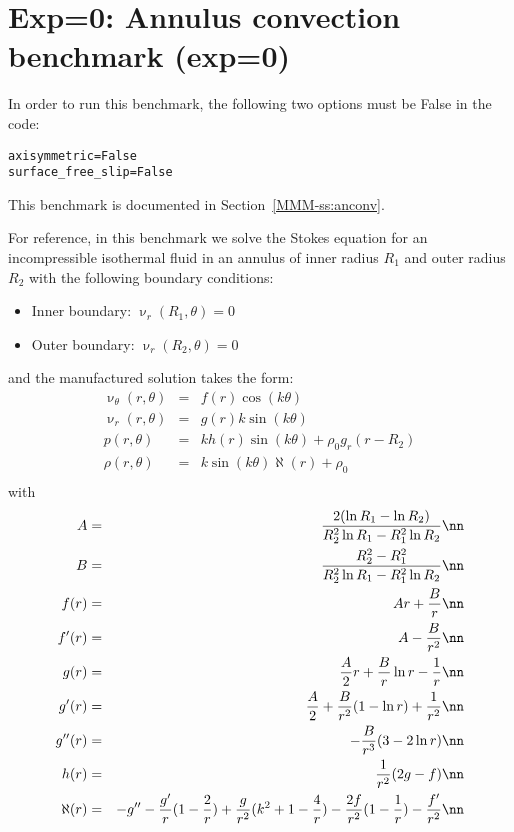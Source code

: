 \section*{Exp=0: Annulus convection benchmark (exp=0)}

In order to run this benchmark, the following two options must be False in the code:
\begin{lstlisting}
axisymmetric=False
surface_free_slip=False
\end{lstlisting}

This benchmark is documented in Section~\ref{MMM-ss:anconv}.

For reference, in this benchmark we solve the Stokes equation for an incompressible
isothermal fluid in an annulus of inner radius $R_1$
and outer radius $R_2$ with the following boundary conditions:
\begin{itemize}
\item Inner boundary: $\upnu_r(R_1,\theta)=0$ 
\item Outer boundary: $\upnu_r(R_2,\theta)=0$ 
\end{itemize}
and the manufactured solution takes the form:
\begin{eqnarray}
\upnu_\theta(r,\theta) &=& f(r) \cos(k\theta) \\
\upnu_r(r,\theta) &=& g(r) k  \sin(k\theta)  \\
p(r,\theta) &=& k h(r) \sin(k \theta) + \rho_0 g_r (r-R_2)  \\
\rho(r,\theta) &=& k \sin (k \theta) \aleph(r) + \rho_0 \\
\end{eqnarray}
with
\begin{eqnarray}
A &=& \frac{2(\ln R_1 - \ln R_2)} { R_2^2 \ln R_1  - R_1^2 \ln R_2}    \nn\\
B &=& \frac{R_2^2-R_1^2}{R_2^2 \ln R_1 - R_1^2 \ln R_2} \nn\\
f(r)   &=& Ar +\frac{B}{r} \nn\\
f'(r)  &=& A - \frac{B}{r^2} \nn\\
g(r)   &=& \frac{A}{2}r  +  \frac{B}{r} \ln r - \frac{1}{r} \nn\\
g'(r)  &=& \frac{A}{2}  +  \frac{B}{r^2} (1-\ln r)   + \frac{1}{r^2} \nn\\
g''(r) &=&  - \frac{B}{r^3} (3 - 2 \ln r )  \nn\\
h(r)   &=& \frac{1}{r^2}(2g-f) \nn\\
\aleph(r) &=&  -g'' - \frac{g'}{r} ( 1 - \frac{2}{r}) + \frac{g}{r^2} (k^2 + 1 -\frac{4}{r})  
- \frac{2f}{r^2}  (1-\frac{1}{r}) - \frac{f'}{r^2}   \nn
\end{eqnarray}

